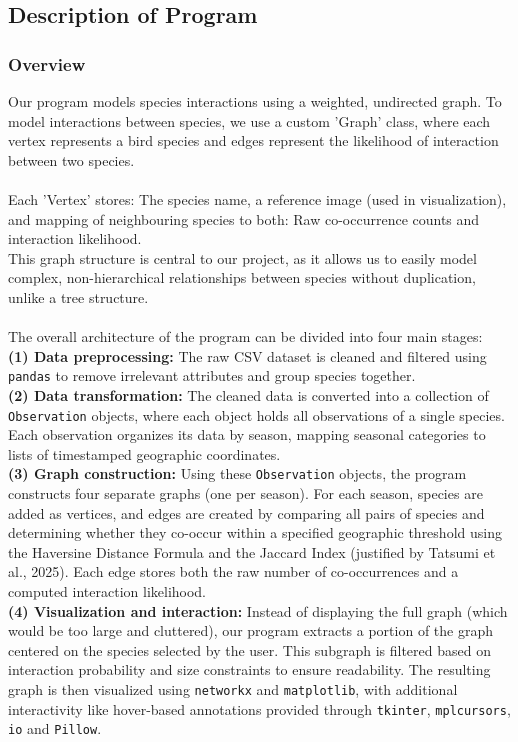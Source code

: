 \documentclass{article}
\begin{document}
\subsection{Description of Program}

\subsubsection{Overview}
Our program models species interactions using a weighted, undirected graph. 
To model interactions between species, we use a custom 'Graph' class, where each vertex represents a bird species and edges represent the likelihood of interaction between two species. \\ \\ Each 'Vertex' stores: The species name, a reference image (used in visualization), and mapping of neighbouring species to both: Raw co-occurrence counts and interaction likelihood. \\
This graph structure is central to our project, as it allows us to easily model complex, non-hierarchical relationships between species without duplication, unlike a tree structure. \\ \\
The overall architecture of the program can be divided into four main stages: \\
\textbf{(1) Data preprocessing:} The raw CSV dataset is cleaned and filtered using \texttt{pandas} to remove irrelevant attributes and group species together. \\
\textbf{(2) Data transformation:} The cleaned data is converted into a collection of \texttt{Observation} objects, where each object holds all observations of a single species. Each observation organizes its data by season, mapping seasonal categories to lists of timestamped geographic coordinates. \\
\textbf{(3) Graph construction:} Using these \texttt{Observation} objects, the program constructs four separate graphs (one per season). For each season, species are added as vertices, and edges are created by comparing all pairs of species and determining whether they co-occur within a specified geographic threshold using the Haversine Distance Formula and the Jaccard Index (justified by Tatsumi et al., 2025). Each edge stores both the raw number of co-occurrences and a computed interaction likelihood. \\
\textbf{(4) Visualization and interaction:} Instead of displaying the full graph (which would be too large and cluttered), our program extracts a portion of the graph centered on the species selected by the user. This subgraph is filtered based on interaction probability and size constraints to ensure readability. The resulting graph is then visualized using \texttt{networkx} and \texttt{matplotlib}, with additional interactivity like hover-based annotations provided through \texttt{tkinter}, \texttt{mplcursors}, \texttt{io} and \texttt{Pillow}.
\end{document}
